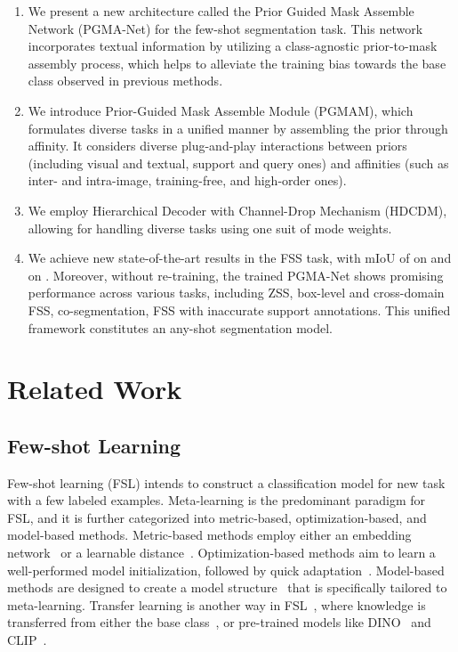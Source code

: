 \documentclass[lettersize,journal]{IEEEtran}
\begin{document}
\begin{enumerate}
    \item We present a new architecture called the Prior Guided Mask Assemble Network (PGMA-Net) for the few-shot segmentation task. This network incorporates textual information by utilizing a class-agnostic prior-to-mask assembly process, which helps to alleviate the training bias towards the base class observed in previous methods.
    \item We introduce Prior-Guided Mask Assemble Module (PGMAM), which formulates diverse tasks in a unified manner by assembling the prior through affinity. It considers diverse plug-and-play interactions between priors (including visual and textual, support and query ones) and affinities (such as inter- and intra-image, training-free, and high-order ones).  
    \item We employ Hierarchical Decoder with Channel-Drop Mechanism (HDCDM), allowing for handling diverse tasks using one suit of mode weights.
    \item We achieve new state-of-the-art results in the FSS task, with mIoU of  on  and  on . Moreover, without re-training, the trained PGMA-Net shows promising performance across various tasks, including ZSS, box-level and cross-domain FSS, co-segmentation, FSS with inaccurate support annotations. This unified framework constitutes an any-shot segmentation model.
  \end{enumerate}



  
  
  \section{Related Work}
\subsection{Few-shot Learning}
Few-shot learning (FSL) intends to construct a classification model for new task with a few labeled examples. Meta-learning is the predominant paradigm for FSL, and it is further categorized into metric-based, optimization-based, and model-based methods. Metric-based methods employ either an embedding network~\cite{vinyals2016matching,snell2017prototypical,ZhangLK23} or a learnable distance~\cite{sung2018learning}. Optimization-based methods aim to learn a well-performed model initialization, followed by quick adaptation~\cite{finn2017model,rajeswaran2019meta}. Model-based methods are designed to create a model structure~\cite{cai2018memory,YangHLHW23} that is specifically tailored to meta-learning. Transfer learning is another way in FSL~\cite{hu2022pushing,zhang2022tip}, where knowledge is transferred from either the base class~\cite{hu2022squeezing}, or pre-trained models like DINO~\cite{caron2021emerging} and CLIP~\cite{radford2021learning}. 
\end{document}
